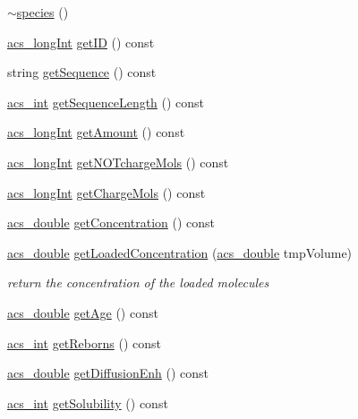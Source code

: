 \begin{DoxyCompactItemize}
\hyperlink{a00022_a4ec3e21535ff68a06dba4e1eed935dc0}{$\sim$species} ()
\item 
\hyperlink{a00024_a19319d75f02db4308bc5c0026d98cd85}{acs\-\_\-long\-Int} \hyperlink{a00022_a59f2a9963c10fcb3748153c73c9c7072}{get\-I\-D} () const 
\item 
string \hyperlink{a00022_a553019883dd1344a7f15b805453e46d1}{get\-Sequence} () const 
\item 
\hyperlink{a00024_a8d277355641a098190360234e2ebde35}{acs\-\_\-int} \hyperlink{a00022_ade5b59eab17c02ff322dcf068f923f9d}{get\-Sequence\-Length} () const 
\item 
\hyperlink{a00024_a19319d75f02db4308bc5c0026d98cd85}{acs\-\_\-long\-Int} \hyperlink{a00022_a53c74ca3861c4cdac2457e7057fbef21}{get\-Amount} () const 
\item 
\hyperlink{a00024_a19319d75f02db4308bc5c0026d98cd85}{acs\-\_\-long\-Int} \hyperlink{a00022_af7293ab371ab92d6d16866ea281e901a}{get\-N\-O\-Tcharge\-Mols} () const 
\item 
\hyperlink{a00024_a19319d75f02db4308bc5c0026d98cd85}{acs\-\_\-long\-Int} \hyperlink{a00022_a3af3e7879c333a55f189cd351f8358ef}{get\-Charge\-Mols} () const 
\item 
\hyperlink{a00024_ab776853a005fcbf56af0424a2a4dd607}{acs\-\_\-double} \hyperlink{a00022_a2baa5d157d49282cee8b59a2db0217b0}{get\-Concentration} () const 
\item 
\hyperlink{a00024_ab776853a005fcbf56af0424a2a4dd607}{acs\-\_\-double} \hyperlink{a00022_ab930176d793e5d3b8ce984013d0e0328}{get\-Loaded\-Concentration} (\hyperlink{a00024_ab776853a005fcbf56af0424a2a4dd607}{acs\-\_\-double} tmp\-Volume)
\begin{DoxyCompactList}\small\item\em return the concentration of the loaded molecules \end{DoxyCompactList}\item 
\hyperlink{a00024_ab776853a005fcbf56af0424a2a4dd607}{acs\-\_\-double} \hyperlink{a00022_a209c36c4e7eda0608f14cc003c344d65}{get\-Age} () const 
\item 
\hyperlink{a00024_a8d277355641a098190360234e2ebde35}{acs\-\_\-int} \hyperlink{a00022_a00fe9b888d23788423cbcdc634eae934}{get\-Reborns} () const 
\item 
\hyperlink{a00024_ab776853a005fcbf56af0424a2a4dd607}{acs\-\_\-double} \hyperlink{a00022_ac609ed0616615f27ed1a3313efcda075}{get\-Diffusion\-Enh} () const 
\item 
\hyperlink{a00024_a8d277355641a098190360234e2ebde35}{acs\-\_\-int} \hyperlink{a00022_a14bde6b3114c4507c0b8018df41eaf4f}{get\-Solubility} () const 

\end{DoxyCompactItemize}
